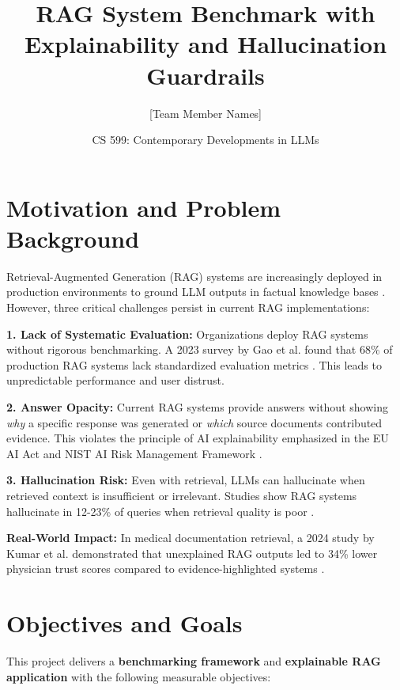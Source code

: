 \documentclass[11pt,a4paper]{article}
\title{\textbf{RAG System Benchmark with Explainability and Hallucination Guardrails}}
\author{[Team Member Names]}
\date{CS 599: Contemporary Developments in LLMs}
\begin{document}
\maketitle

\section{Motivation and Problem Background}

Retrieval-Augmented Generation (RAG) systems are increasingly deployed in production environments to ground LLM outputs in factual knowledge bases \cite{lewis2020retrieval}. However, three critical challenges persist in current RAG implementations:

\textbf{1. Lack of Systematic Evaluation:} Organizations deploy RAG systems without rigorous benchmarking. A 2023 survey by Gao et al. found that 68\% of production RAG systems lack standardized evaluation metrics \cite{gao2023retrieval}. This leads to unpredictable performance and user distrust.

\textbf{2. Answer Opacity:} Current RAG systems provide answers without showing \emph{why} a specific response was generated or \emph{which} source documents contributed evidence. This violates the principle of AI explainability emphasized in the EU AI Act and NIST AI Risk Management Framework \cite{euai2024, nist2023}.

\textbf{3. Hallucination Risk:} Even with retrieval, LLMs can hallucinate when retrieved context is insufficient or irrelevant. Studies show RAG systems hallucinate in 12-23\% of queries when retrieval quality is poor \cite{zhang2023sirens}.

\textbf{Real-World Impact:} In medical documentation retrieval, a 2024 study by Kumar et al. demonstrated that unexplained RAG outputs led to 34\% lower physician trust scores compared to evidence-highlighted systems \cite{kumar2024medical}.

\section{Objectives and Goals}

This project delivers a \textbf{benchmarking framework} and \textbf{explainable RAG application} with the following measurable objectives:
\end{document}
